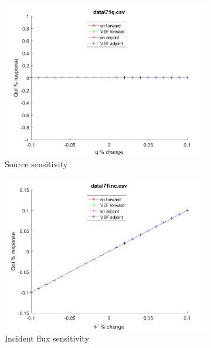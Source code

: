 \documentclass{article}
\begin{document}
\begin{figure}[H]
\label{Case71Sens}
\centering
\begin{subfigure}{.5\textwidth}
  \centering
  \includegraphics[width=.98\linewidth]{IanProposal/figures2/71qSens.png}
  \caption{Source sensitivity}
  \label{fig:sfig1}
\end{subfigure}%
\begin{subfigure}{.5\textwidth}
  \centering
  \includegraphics[width=.98\linewidth]{IanProposal/figures2/71incSens.png}
  \caption{Incident flux sensitivity}
  \label{fig:sfig4}
\end{subfigure}%
\\
\begin{subfigure}{.5\textwidth}
  \centering

\end{subfigure}
\end{figure}
\end{document}
